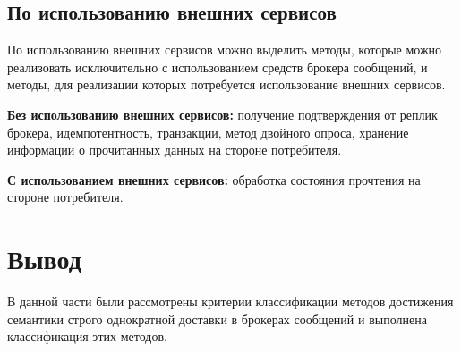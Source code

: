 \subsection{По использованию внешних сервисов}
По использованию внешних сервисов можно выделить методы, которые можно реализовать исключительно с использованием средств брокера сообщений, и методы, для реализации которых потребуется использование внешних сервисов.

\textbf{Без использованию внешних сервисов:} получение подтверждения от реплик брокера, идемпотентность, транзакции, метод двойного опроса, хранение информации о прочитанных данных на стороне потребителя.

\textbf{С использованием внешних сервисов:} обработка состояния прочтения на стороне потребителя.

\section{Вывод}

В данной части были рассмотрены критерии классификации методов достижения семантики строго однократной доставки в брокерах сообщений  и выполнена классификация этих методов.